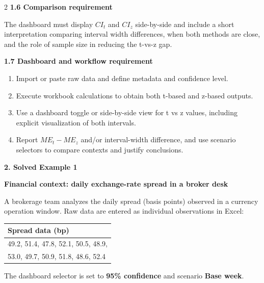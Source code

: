 \documentclass[12pt]{article}
\newcommand{\SubsectionBox}[1]{%
	\noindent\colorbox{gray!30}{%
		\parbox{\linewidth}{\textbf{#1}}%
	}\par\vspace{0.35cm}%
}
\begin{document}
\begin{multicols}{2}
		\textbf{1.6 Comparison requirement}\par
		The dashboard must display $CI_t$ and $CI_z$ side-by-side and include a short interpretation comparing interval width differences, when both methods are close, and the role of sample size in reducing the t-vs-z gap.
		
		\textbf{1.7 Dashboard and workflow requirement}\par
		\begin{enumerate}
			\item Import or paste raw data and define metadata and confidence level.
			\item Execute workbook calculations to obtain both t-based and z-based outputs.
			\item Use a dashboard toggle or side-by-side view for t vs z values, including explicit visualization of both intervals.
			\item Report $ME_t-ME_z$ and/or interval-width difference, and use scenario selectors to compare contexts and justify conclusions.
		\end{enumerate}
		
		\newpage
		\SubsectionBox{2. Solved Example 1}
		
		\textbf{Financial context: daily exchange-rate spread in a broker desk}\par
		A brokerage team analyzes the daily spread (basis points) observed in a currency operation window.
		Raw data are entered as individual observations in Excel:
		
		\begin{center}
			\begin{tabular}{l}
				\hline
				Spread data (bp) \\
				\hline
				49.2, 51.4, 47.8, 52.1, 50.5, 48.9,\\
				53.0, 49.7, 50.9, 51.8, 48.6, 52.4 \\
				\hline
			\end{tabular}
		\end{center}
		The dashboard selector is set to \textbf{95\% confidence} and scenario \textbf{Base week}.
		

\end{multicols}
\end{document}
